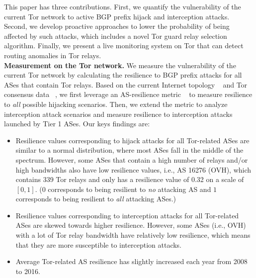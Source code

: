 This paper has three contributions. First, we quantify the vulnerability of the current Tor network to active BGP prefix hijack and interception attacks. Second, we develop proactive approaches to lower the probability of being affected by such attacks, which includes a novel Tor guard relay selection algorithm. Finally, we present a live monitoring system on Tor that can detect routing anomalies in Tor relays. 
\\
\textbf{Measurement on the Tor network.} We measure the vulnerability of the current Tor network by calculating the resilience to BGP prefix attacks for all ASes that contain Tor relays. Based on the current Internet topology ~\cite{topology} and Tor consensus data ~\cite{torconsensus}, we first leverage an AS-resilience metric ~\cite{lad2007understanding} to measure resilience to \emph{all} possible hijacking scenarios. Then, we extend the metric to analyze interception attack scenarios and measure resilience to interception attacks launched by Tier 1 ASes. Our keys findings are:
\begin{itemize}
\item Resilience values corresponding to hijack attacks for all Tor-related ASes are similar to a normal distribution, where most ASes fall in the middle of the spectrum. However, some ASes that contain a high number of relays and/or high bandwidths also have low resilience values, i.e., AS 16276 (OVH), which contains 339 Tor relays and only has a resilience value of 0.32 on a scale of $[0,1]$. ($0$ corresponds to being resilient to \emph{no} attacking AS and $1$ corresponds to being resilient to \emph{all} attacking ASes.)
\item Resilience values corresponding to interception attacks for all Tor-related ASes are skewed towards higher resilience. However, some ASes (i.e., OVH) with a lot of Tor relay bandwidth have relatively low resilience, which means that they are more susceptible to interception attacks. 
\item Average Tor-related AS resilience has slightly increased each year from 2008 to 2016. 
\end{itemize}

